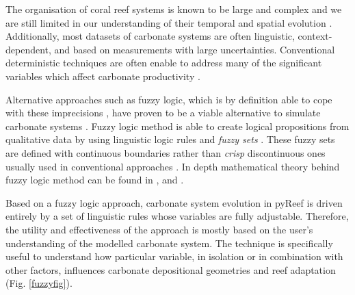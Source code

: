 \documentclass[default,jgrga]{agutex2015}
\begin{document}
\begin{article}
The organisation of coral reef systems is known to be large and complex and we are still limited in our understanding of their temporal and spatial evolution \citep{Demicco98}. Additionally, most datasets of carbonate systems are often linguistic, context-dependent, and based on measurements with large uncertainties. Conventional deterministic techniques are often enable to address many of the significant variables which affect carbonate productivity \citep{Parcell98}.

Alternative approaches such as fuzzy logic, which is by definition able to cope with these imprecisions \citep{Demicco01, Collin15}, have proven to be a viable alternative to simulate carbonate systems \citep{Salles11, Hattab13}. Fuzzy logic method is able to create logical propositions from qualitative data by using linguistic logic rules and \textit{fuzzy sets} \citep{Nordlund96}. These fuzzy sets are defined with continuous boundaries rather than \textit{crisp} discontinuous ones usually used in conventional approaches \citep{Meesters98}. In depth mathematical theory behind fuzzy logic method can be found in \citet{Zadeh65}, \citet{Zimmerman91} and \citet{Berkan97}.

\noindent Based on a fuzzy logic approach, carbonate system evolution in pyReef is driven entirely by a set of linguistic rules whose variables are fully adjustable. Therefore, the utility and effectiveness of the approach is mostly based on the user's understanding of the modelled carbonate system. The technique is specifically useful to understand how particular variable, in isolation or in combination with other factors, influences carbonate depositional geometries and reef adaptation (Fig. \ref{fuzzyfig}).


\end{article}
\end{document}

